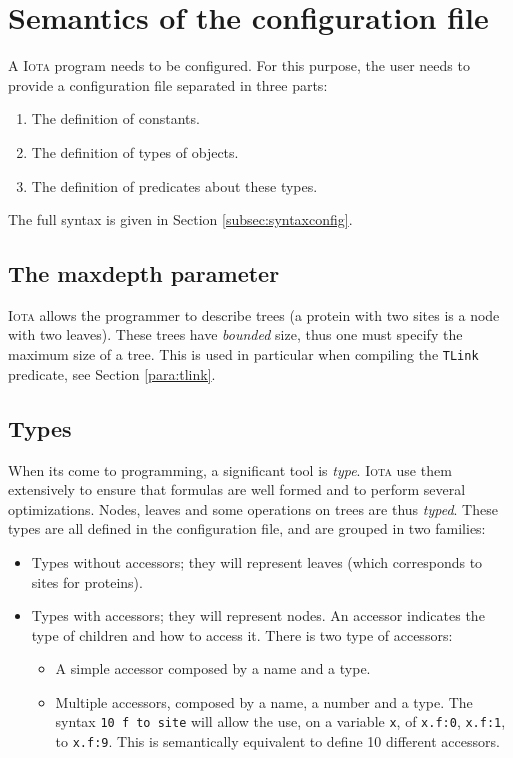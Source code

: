 \documentclass[10pt,a4paper]{article}
\newcommand\Iota{\textsc{Iota}}
\newcommand{\ocaml}{\texttt}
\begin{document}
\section{Semantics of the configuration file}
A \Iota{} program needs to be configured. For this purpose, the user needs to provide a configuration file separated in three parts:
\begin{enumerate}
\item The definition of constants.
\item The definition of types of objects.
\item The definition of predicates about these types.
\end{enumerate}

The full syntax is given in Section \ref{subsec:syntaxconfig}.
\subsection{The maxdepth parameter}
\Iota{} allows the programmer to describe trees (a protein with two sites is a node with two leaves). These trees have \emph{bounded} size, thus one must specify the maximum size of a tree. This is used in particular when compiling the \ocaml{TLink} predicate, see Section \ref{para:tlink}.

\subsection{Types}
When its come to programming, a significant tool is \emph{type}. \Iota{} use them extensively to ensure that formulas are well formed and to perform several optimizations.
Nodes, leaves and some operations on trees are thus \emph{typed}. These types are all defined in the configuration file, and are grouped in two families:
\begin{itemize}
\item Types without accessors; they will represent leaves (which corresponds to sites for proteins).
\item Types with accessors; they will represent nodes. An accessor indicates the type of children and how to access it. There is two type of accessors:
  \begin{itemize}
  \item A simple accessor composed by a name and a type.
  \item Multiple accessors, composed by a name, a number and a type. The syntax \ocaml{10 f to site} will allow the use, on a variable \ocaml{x}, of \ocaml{x.f:0}, \ocaml{x.f:1}, to \ocaml{x.f:9}. This is semantically equivalent to define 10 different accessors.
  \end{itemize}
\end{itemize}
\end{document}
